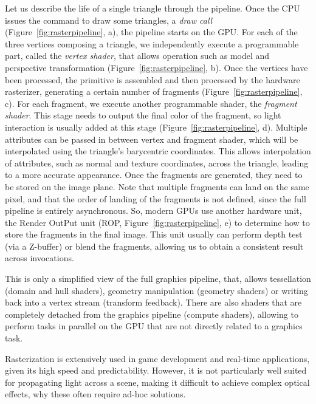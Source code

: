 Let us describe the life of a single triangle through the pipeline. Once the CPU issues the command to draw some triangles, a \emph{draw call} (Figure~\ref{fig:rasterpipeline}, a), the pipeline starts on the GPU. For each of the three vertices composing a triangle, we independently execute a programmable part, called the \emph{vertex shader}, that allows operation such as model and perspective transformation (Figure~\ref{fig:rasterpipeline}, b). Once the vertices have been processed, the primitive is assembled and then processed by the hardware rasterizer, generating a certain number of fragments  (Figure~\ref{fig:rasterpipeline}, c). For each fragment, we execute another programmable shader, the \emph{fragment shader}. This stage needs to output the final color of the fragment, so light interaction is usually added at this stage (Figure~\ref{fig:rasterpipeline}, d). Multiple attributes can be passed in between vertex and fragment shader, which will be interpolated using the triangle's barycentric coordinates. This allows interpolation of attributes, such as normal and texture coordinates, across the triangle, leading to a more accurate appearance. Once the fragments are generated, they need to be stored on the image plane. Note that multiple fragments can land on the same pixel, and that the order of landing of the fragments is not defined, since the full pipeline is entirely asynchronous. So, modern GPUs use another hardware unit, the Render OutPut unit (ROP, Figure~\ref{fig:rasterpipeline}, e) to determine how to store the fragments in the final image. This unit usually can perform depth test (via a Z-buffer) or blend the fragments, allowing us to obtain a consistent result across invocations.

This is only a simplified view of the full graphics pipeline, that, allows tessellation (domain and hull shaders), geometry manipulation (geometry shaders) or writing back into a vertex stream (transform feedback). There are also shaders that are completely detached from the graphics pipeline (compute shaders), allowing to perform tasks in parallel on the GPU that are not directly related to a graphics task. 

Rasterization is extensively used in game development and real-time applications, given its high speed and predictability. However, it is not particularly well suited for propagating light across a scene, making it difficult to achieve complex optical effects, why these often require ad-hoc solutions.

